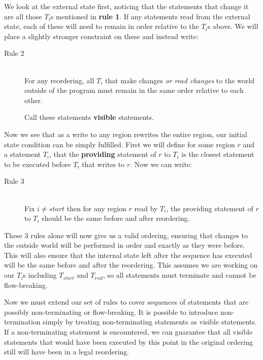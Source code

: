 \documentclass{report}
\begin{document}
We look at the external state first, noticing that the statements that change it are all those $T_i$s mentioned in \textbf{rule 1}. If any statements
read from the external state, each of these will need to remain in order relative to the $T_i$s above. We will place a slightly stronger constraint on these
and instead write:

\begin{description}
\item[Rule 2] \hfill \\
For any reordering, all $T_i$ that make changes \textit{or read changes} to the world outside of the program must remain in the same order relative to each other.

Call these statements \textbf{visible} statements.
\end{description}

Now we see that as a write to any region rewrites the entire region, our initial state condition can be simply fulfilled. First we will define for some region
$r$ and a statement $T_i$, that the \textbf{providing} statement of $r$ to $T_i$ is the closest statement to be executed before $T_i$ that writes to $r$. Now
we can write:

\begin{description}
\item[Rule 3] \hfill \\
Fix $i \ne {start}$ then for any region $r$ read by $T_i$, the providing statement of $r$ to $T_i$ should be the same before and after reordering.
\end{description}

These 3 rules alone will now give us a valid ordering, ensuring that changes to the outside world will be performed in order and exactly as they were before.
This will also ensure that the internal state left after the sequence has executed will be the same before and after the reordering. This assumes we are working
on our $T_i$s including $T_{start}$ and $T_{end}$, so all statements must terminate and cannot be flow-breaking.

Now we must extend our set of rules to cover sequences of statements that are possibly non-terminating or flow-breaking. It is possible to introduce non-termination
simply by treating non-terminating statements as visible statements. If a non-terminating statement is encountered, we can guarantee that all visible statements that
would have been executed by this point in the original ordering still will have been in a legal reordering.
\end{document}
